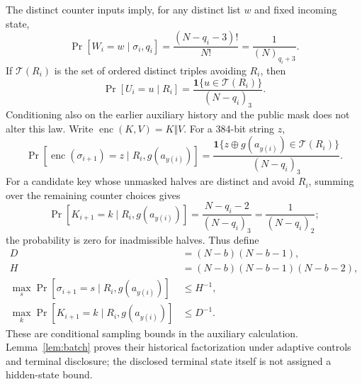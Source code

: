 \documentclass[journal=tosc,preprint,floatrow,nohyperxmp]{iacrtrans}
\newif\ifjordireview
\newcounter{jordinote}
\newcommand{\jordinote}[2]{%
  \ifjordireview
  \stepcounter{jordinote}\par\medskip\noindent
  \fcolorbox{blue!55!black}{blue!4}{%
    \begin{minipage}{\dimexpr\linewidth-2\fboxsep-2\fboxrule\relax}
    \small\raggedright\color{blue!45!black}
    \textbf{Solo Jordi -- J\thejordinote: #1}\par\smallskip
    #2
    \end{minipage}}\par\medskip
  \fi
}
\numberwithin{lemma}{section}
\numberwithin{proposition}{section}
\newcommand{\fall}[2]{(#1)_{#2}}
\numberwithin{equation}{section}
\theoremstyle{definition}
\numberwithin{definition}{section}
\theoremstyle{plain}
\begin{document}
The distinct counter inputs imply, for any distinct list $w$ and fixed incoming state,
\begin{equation}
 \Pr[W_i=w\mid \sigma_i,q_i]
 =\frac{(N-q_i-3)!}{N!}=\frac1{\fall N{q_i+3}}.
 \label{eq:local-batch-law}
\end{equation}
If $\mathcal T(R_i)$ is the set of ordered distinct triples avoiding $R_i$, then
\begin{equation}
 \Pr[U_i=u\mid R_i]=
 \frac{\mathbf1\{u\in\mathcal T(R_i)\}}{\fall{N-q_i}3}.
 \label{eq:local-triple-law}
\end{equation}
Conditioning also on the earlier auxiliary history and the public mask does not alter this law. Write $\operatorname{enc}(K,V)=K\Vert V$. For a 384-bit string $z$,
\begin{equation}
 \Pr[\operatorname{enc}(\sigma_{i+1})=z\mid R_i,g(a_{y(i)})]
 =\frac{\mathbf1\{z\oplus g(a_{y(i)})\in\mathcal T(R_i)\}}{\fall{N-q_i}3}.
 \label{eq:masked-state-law}
\end{equation}
For a candidate key whose unmasked halves are distinct and avoid $R_i$, summing over the remaining counter choices gives
\begin{equation}
 \Pr[K_{i+1}=k\mid R_i,g(a_{y(i)})]
 =\frac{N-q_i-2}{\fall{N-q_i}3}
 =\frac1{\fall{N-q_i}2};\label{eq:key-marginal}
\end{equation}
the probability is zero for inadmissible halves. Thus define
\begin{equation}
\begin{aligned}
 D&=(N-b)(N-b-1),\\
 H&=(N-b)(N-b-1)(N-b-2),\\
 \max_s\Pr[\sigma_{i+1}=s\mid R_i,g(a_{y(i)})]&\le H^{-1},\\
 \max_k\Pr[K_{i+1}=k\mid R_i,g(a_{y(i)})]&\le D^{-1}.
\end{aligned}
 \label{eq:constants}
\end{equation}
These are conditional sampling bounds in the auxiliary calculation. Lemma~\ref{lem:batch} proves their historical factorization under adaptive controls and terminal disclosure; the disclosed terminal state itself is not assigned a hidden-state bound.

\jordinote{Por qué introducimos grupos privados}{Las permutaciones privadas son un cálculo auxiliar que facilita contar distribuciones; todavía no son el generador real con tablas compartidas. Aquí obtenemos las masas del estado y de la clave tras XOR. Comprueba el denominador y la suma sobre el tercer bloque. La transferencia al generador real depende del acoplamiento posterior; no podemos saltarnos ese paso ni tratar el estado terminal revelado como secreto.}
\end{document}
